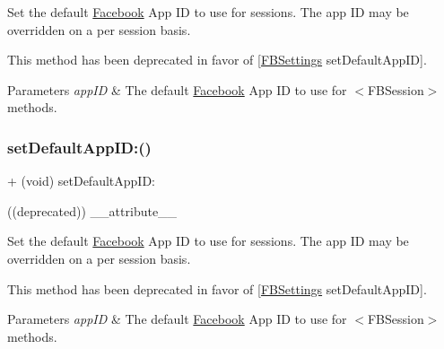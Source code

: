 Set the default \hyperlink{interfaceFacebook}{Facebook} App ID to use for sessions. The app ID may be overridden on a per session basis.

This method has been deprecated in favor of \mbox{[}\hyperlink{interfaceFBSettings}{F\+B\+Settings} set\+Default\+App\+ID\mbox{]}.


\begin{DoxyParams}{Parameters}
{\em app\+ID} & The default \hyperlink{interfaceFacebook}{Facebook} App ID to use for $<$\+F\+B\+Session$>$ methods. \\
\hline
\end{DoxyParams}
\mbox{\label{interfaceFBSession_afb4f41ffcd4d824a16147cb41b932a32}} 
\subsubsection{\texorpdfstring{set\+Default\+App\+I\+D\+:()}{setDefaultAppID:()}\hspace{0.1cm}{\footnotesize\ttfamily [5/5]}}
{\footnotesize\ttfamily + (void) set\+Default\+App\+I\+D\+: \begin{DoxyParamCaption}\item[{((deprecated))}]{\+\_\+\+\_\+attribute\+\_\+\+\_\+ }\end{DoxyParamCaption}}

Set the default \hyperlink{interfaceFacebook}{Facebook} App ID to use for sessions. The app ID may be overridden on a per session basis.

This method has been deprecated in favor of \mbox{[}\hyperlink{interfaceFBSettings}{F\+B\+Settings} set\+Default\+App\+ID\mbox{]}.


\begin{DoxyParams}{Parameters}
{\em app\+ID} & The default \hyperlink{interfaceFacebook}{Facebook} App ID to use for $<$\+F\+B\+Session$>$ methods. \\
\hline
\end{DoxyParams}
\mbox{\label{interfaceFBSession_ac3d4f0df3cae8fe5091b9d98b9f166d4}} 

